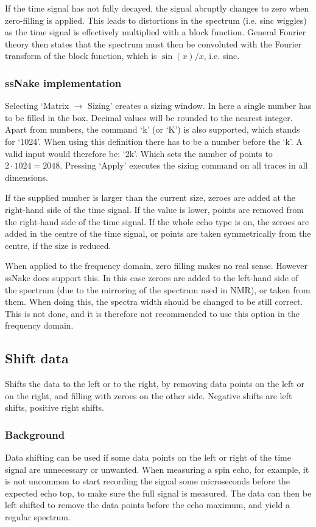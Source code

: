 \documentclass[11pt,a4paper]{article}
\begin{document}
If the time signal has not fully decayed, the signal abruptly changes to zero when zero-filling is applied. This leads to distortions in the spectrum (i.e. sinc wiggles) as the time signal is effectively multiplied with a block function. General Fourier theory then states that the spectrum must then be convoluted with the Fourier transform of the block function, which is $\sin(x)/x$, i.e. sinc.

\subsubsection*{ssNake implementation}
Selecting `Matrix $\rightarrow$ Sizing' creates a sizing window. In here a single number has to be filled in the box. Decimal values will be rounded to the nearest integer. Apart from numbers, the command `k' (or `K') is also supported, which stands for `1024'. When using this definition there has to be a number before the `k'. A valid input would therefore be: `2k'. Which sets the number of points to $2 \cdot 1024=2048$. Pressing `Apply' executes the sizing command on all traces in all dimensions.

If the supplied number is larger than the current size, zeroes are added at the right-hand side of the time signal. If the value is lower, points are removed from the right-hand side of the time signal. If the whole echo type is on, the zeroes are added in the centre of the time signal, or points are taken symmetrically from the centre, if the size is reduced.

When applied to the frequency domain, zero filling makes no real sense. However ssNake does support this. In this case zeroes are added to the left-hand side of the spectrum (due to the mirroring of the spectrum used in NMR), or taken from them. When doing this, the spectra width should be changed to be still correct. This is not done, and it is therefore not recommended to use this option in the frequency domain.

\subsection{Shift data}
Shifts the data to the left or to the right, by removing data points on the left or on the right, and filling with zeroes on the other side. Negative shifts are left shifts, positive right shifts.

\subsubsection*{Background}
Data shifting can be used if some data points on the left or right of the time signal are unnecessary or unwanted. When measuring a spin echo, for example, it is not uncommon to start recording the signal some microseconds before the expected echo top, to make sure the full signal is measured. The data can then be left shifted to remove the data points before the echo maximum, and yield a regular spectrum.
\end{document}

